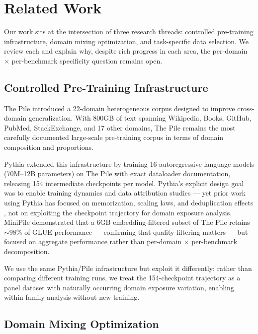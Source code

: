 \section{Related Work}

Our work sits at the intersection of three research threads: controlled pre-training infrastructure, domain mixing optimization, and task-specific data selection. We review each and explain why, despite rich progress in each area, the per-domain $\times$ per-benchmark specificity question remains open.

\subsection{Controlled Pre-Training Infrastructure}

The Pile \cite{Gao2020Pile} introduced a 22-domain heterogeneous corpus designed to improve cross-domain generalization. With 800GB of text spanning Wikipedia, Books, GitHub, PubMed, StackExchange, and 17 other domains, The Pile remains the most carefully documented large-scale pre-training corpus in terms of domain composition and proportions.

Pythia \cite{Biderman2023Pythia} extended this infrastructure by training 16 autoregressive language models (70M--12B parameters) on The Pile with exact dataloader documentation, releasing 154 intermediate checkpoints per model. Pythia's explicit design goal was to enable training dynamics and data attribution studies --- yet prior work using Pythia has focused on memorization, scaling laws, and deduplication effects \cite{Biderman2023Pythia}, not on exploiting the checkpoint trajectory for domain exposure analysis. MiniPile \cite{Kaddour2023MiniPile} demonstrated that a 6GB embedding-filtered subset of The Pile retains $\sim$98\% of GLUE performance --- confirming that quality filtering matters --- but focused on aggregate performance rather than per-domain $\times$ per-benchmark decomposition.

We use the same Pythia/Pile infrastructure but exploit it differently: rather than comparing different training runs, we treat the 154-checkpoint trajectory as a panel dataset with naturally occurring domain exposure variation, enabling within-family analysis without new training.

\subsection{Domain Mixing Optimization}

